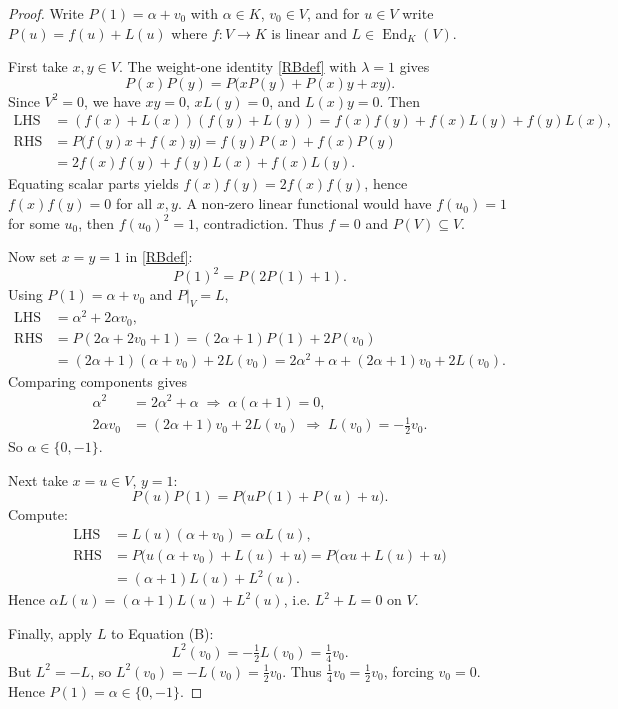 \documentclass[a4paper,11pt]{elsarticle}
\theoremstyle{definition}
\theoremstyle{remark}
\DeclareMathOperator{\End}{End}
\begin{document}
\begin{proof}
Write $P(1) = \alpha + v_0$ with $\alpha \in K$, $v_0 \in V$, and for $u \in V$ write $P(u) = f(u) + L(u)$ where $f : V \to K$ is linear and $L \in \End_K(V)$.

First take $x, y \in V$.  The weight‑one identity \eqref{RBdef} with $\lambda=1$ gives
\[
P(x)P(y) = P\bigl(x P(y) + P(x) y + xy\bigr).
\]
Since $V^2=0$, we have $xy=0$, $x L(y)=0$, and $L(x) y=0$.  Then
\begin{align*}
\text{LHS} &= (f(x)+L(x))(f(y)+L(y)) = f(x)f(y) + f(x)L(y) + f(y)L(x),\\
\text{RHS} &= P\bigl(f(y)x + f(x)y\bigr) = f(y)P(x) + f(x)P(y)\\
 &= 2f(x)f(y) + f(y)L(x) + f(x)L(y).
\end{align*}
Equating scalar parts yields $f(x)f(y) = 2f(x)f(y)$, hence $f(x)f(y)=0$ for all $x,y$.  A non‑zero linear functional would have $f(u_0)=1$ for some $u_0$, then $f(u_0)^2=1$, contradiction.  Thus $f=0$ and $P(V) \subseteq V$.

Now set $x = y = 1$ in \eqref{RBdef}:
\[
P(1)^2 = P(2P(1) + 1).
\]
Using $P(1)=\alpha+v_0$ and $P|_V = L$,
\begin{align*}
\text{LHS} &= \alpha^2 + 2\alpha v_0,\\
\text{RHS} &= P(2\alpha + 2v_0 + 1) = (2\alpha+1)P(1) + 2P(v_0) \\
&= (2\alpha+1)(\alpha+v_0) + 2L(v_0) = 2\alpha^2+\alpha + (2\alpha+1)v_0 + 2L(v_0).
\end{align*}
Comparing components gives
\begin{align*}
\alpha^2 &= 2\alpha^2 + \alpha \;\Longrightarrow\; \alpha(\alpha+1)=0,\\
2\alpha v_0 &= (2\alpha+1)v_0 + 2L(v_0) \;\Longrightarrow\; L(v_0) = -\tfrac12 v_0. \tag{B}
\end{align*}
So $\alpha \in \{0, -1\}$.

Next take $x = u \in V$, $y = 1$:
\[
P(u)P(1) = P\bigl(u P(1) + P(u) + u\bigr).
\]
Compute:
\begin{align*}
\text{LHS} &= L(u)(\alpha+v_0) = \alpha L(u),\\
\text{RHS} &= P\bigl(u(\alpha+v_0) + L(u) + u\bigr) = P\bigl(\alpha u + L(u) + u\bigr)\\
&= (\alpha+1)L(u) + L^2(u).
\end{align*}
Hence $\alpha L(u) = (\alpha+1)L(u) + L^2(u)$, i.e. $L^2 + L = 0$ on $V$.

Finally, apply $L$ to Equation (B):
\[
L^2(v_0) = -\tfrac12 L(v_0) = \tfrac14 v_0.
\]
But $L^2 = -L$, so $L^2(v_0) = -L(v_0) = \tfrac12 v_0$.  Thus $\tfrac14 v_0 = \tfrac12 v_0$, forcing $v_0=0$.  Hence $P(1) = \alpha \in \{0,-1\}$.
\end{proof}
\end{document}
